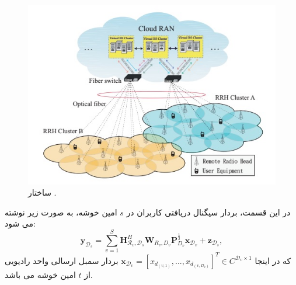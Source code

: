  \begin{figure}[H]
  \centering
    \includegraphics[scale=1]{./fig/mimoCRAN}
  \caption{ساختار  \cite{EEcluster}.}
  \label{fig:mimoC-RAN}
\end{figure}
در این قسمت، بردار سیگنال دریافتی کاربران در $s$ امین خوشه، به صورت زیر نوشته می شود:
\begin{equation} \label{sg}
\boldsymbol{y}_{\mathcal{D}_s} = \sum_{v=1}^S \boldsymbol{H}^H_{\mathcal{R}_v,\mathcal{D}_s}\boldsymbol{W}_{R_v, {D}_v}\boldsymbol{P}_{{D}_v}^\frac{1}{2}\boldsymbol{x}_{\mathcal{D}_v}+ \boldsymbol{z}_{\mathcal{D}_s},
\end{equation}
که در اینجا 
$\boldsymbol{x}_{ \mathcal{D}_v} = [x_{ d_{(v,1)}},..., x_{ d_{(v,D_v)}}]^T \in C^{ \mathcal{D}_v \times 1} $ 
بردار سمبل ارسالی واحد رادیویی از $t$ امین خوشه می باشد.

